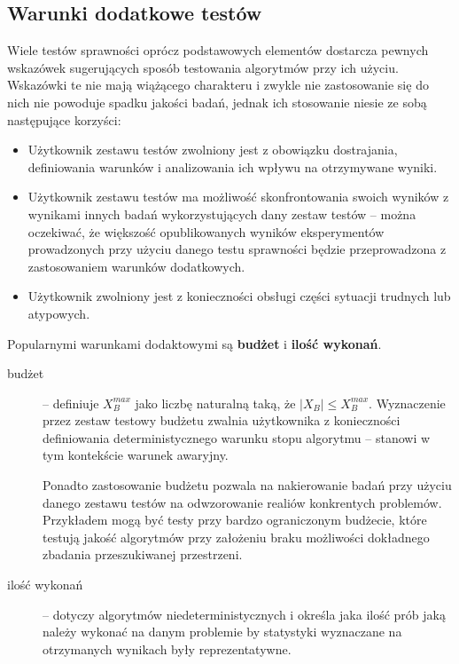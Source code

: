 \documentclass[12pt,a4paper]{report}
\begin{document}
{{{{\subsection{Warunki dodatkowe testów}
\par
{
Wiele testów sprawności oprócz podstawowych elementów dostarcza pewnych wskazówek sugerujących sposób testowania algorytmów przy ich użyciu. Wskazówki te nie mają wiążącego charakteru i zwykle nie zastosowanie się do nich nie powoduje spadku jakości badań, jednak ich stosowanie niesie ze sobą następujące korzyści:
\begin{itemize}
\item Użytkownik zestawu testów zwolniony jest z obowiązku dostrajania, definiowania warunków i analizowania ich wpływu na otrzymywane wyniki.
\item Użytkownik zestawu testów ma możliwość skonfrontowania swoich wyników z wynikami innych badań wykorzystujących dany zestaw testów -- można oczekiwać, że większość opublikowanych wyników eksperymentów prowadzonych przy użyciu danego testu sprawności będzie przeprowadzona z zastosowaniem warunków dodatkowych.
\item Użytkownik zwolniony jest z konieczności obsługi części sytuacji trudnych lub atypowych.
\end{itemize}
}
\par{
Popularnymi warunkami dodaktowymi są \textbf{budżet} i \textbf{ilość wykonań}.
\begin{description}
\item[budżet] -- definiuje $X_{B}^{max}$ jako liczbę naturalną taką, że $|X_B| \le X_{B}^{max}$. Wyznaczenie przez zestaw testowy budżetu zwalnia użytkownika z konieczności definiowania deterministycznego warunku stopu algorytmu -- stanowi w tym kontekście warunek awaryjny.

Ponadto zastosowanie budżetu pozwala na nakierowanie badań przy użyciu danego zestawu testów na odwzorowanie realiów konkrentych problemów. Przykładem mogą być testy przy bardzo ograniczonym budżecie, które testują jakość algorytmów przy założeniu braku możliwości dokładnego zbadania przeszukiwanej przestrzeni.
\item[ilość wykonań] -- dotyczy algorytmów niedeterministycznych i określa jaka ilość prób jaką należy wykonać na danym problemie by statystyki wyznaczane na otrzymanych wynikach były reprezentatywne.
\end{description}
}

}}}}
\end{document}
